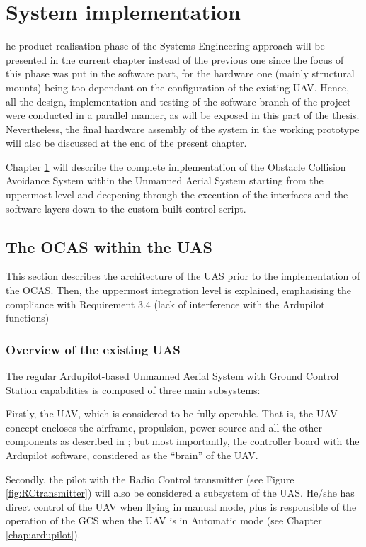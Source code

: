 
\let\textcircled=\pgftextcircled
\chapter{System implementation}	\label{chap:implementation}

he product realisation phase of the Systems Engineering approach will be presented in the current chapter instead of the previous one since the focus of this phase was put in the software part, for the hardware one (mainly structural mounts) being too dependant on the configuration of the existing UAV.
Hence, all the design, implementation and testing of the software branch of the project were conducted in a parallel manner, as will be exposed in this part of the thesis.
Nevertheless, the final hardware assembly of the system in the working prototype will also be discussed at the end of the present chapter.

Chapter \ref{chap:implementation} will describe the complete implementation of the Obstacle Collision Avoidance System within the Unmanned Aerial System starting from the uppermost level and deepening through the execution of the interfaces and the software layers down to the custom-built control script.


\section{The OCAS within the UAS}

This section describes the architecture of the UAS prior to the implementation of the OCAS.
Then, the uppermost integration level is explained, emphasising the compliance with Requirement 3.4 (lack of interference with the Ardupilot functions)

\subsection{Overview of the existing UAS}

The regular Ardupilot-based Unmanned Aerial System with Ground Control Station capabilities is composed of three main subsystems:

Firstly, the UAV, which is considered to be fully operable.
That is, the UAV concept encloses the airframe, propulsion, power source and all the other components as described in \cite{arteta2015}; but most importantly, the controller board with the Ardupilot software, considered as the ``brain'' of the UAV.

Secondly, the pilot with the Radio Control transmitter (see Figure \ref{fig:RCtransmitter}) will also be considered a subsystem of the UAS.
He/she has direct control of the UAV when flying in manual mode, plus is responsible of the operation of the GCS when the UAV is in Automatic mode (see Chapter \ref{chap:ardupilot}).

